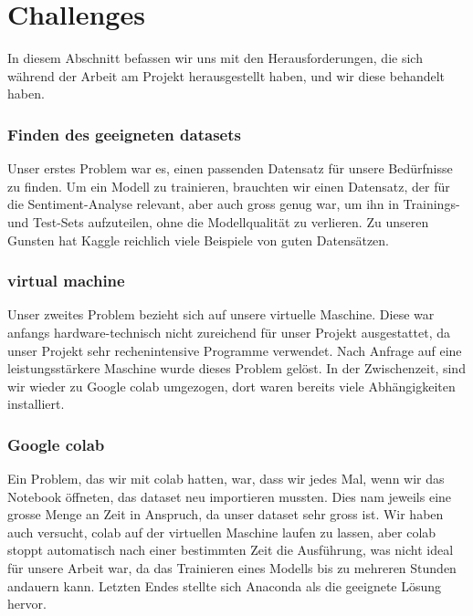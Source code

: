 \section{Challenges}
In diesem Abschnitt befassen wir uns mit den Herausforderungen, die sich während der Arbeit am Projekt herausgestellt haben, und wir diese behandelt haben.

\subsubsection*{Finden des geeigneten \gls{dataset}s} 
Unser erstes Problem war es, einen passenden Datensatz für unsere Bedürfnisse zu finden. Um ein Modell zu trainieren, brauchten wir einen Datensatz, der für die Sentiment-Analyse relevant, aber auch gross genug war, um ihn in Trainings- und Test-Sets aufzuteilen, ohne die Modellqualität zu verlieren. Zu unseren Gunsten hat Kaggle reichlich viele Beispiele von guten Datensätzen.

\subsubsection*{\gls{virtual machine}}
Unser zweites Problem bezieht sich auf unsere virtuelle Maschine. Diese war anfangs hardware-technisch nicht zureichend für unser Projekt ausgestattet, da unser Projekt sehr rechenintensive Programme verwendet. Nach Anfrage auf eine leistungsstärkere Maschine wurde dieses Problem gelöst. In der Zwischenzeit, sind wir wieder zu Google \gls{colab} umgezogen, dort waren bereits viele Abhängigkeiten installiert.

\subsubsection*{Google \gls{colab}}
Ein Problem, das wir mit \gls{colab} hatten, war, dass wir jedes Mal, wenn wir das Notebook öffneten, das \gls{dataset} neu importieren mussten. Dies nam jeweils eine grosse Menge an Zeit in Anspruch, da unser \gls{dataset} sehr gross ist. Wir haben auch versucht, \gls{colab} auf der virtuellen Maschine laufen zu lassen, aber \gls{colab} stoppt automatisch nach einer bestimmten Zeit die Ausführung, was nicht ideal für unsere Arbeit war, da das Trainieren eines Modells bis zu mehreren Stunden andauern kann. Letzten Endes stellte sich Anaconda als die geeignete Lösung hervor.

